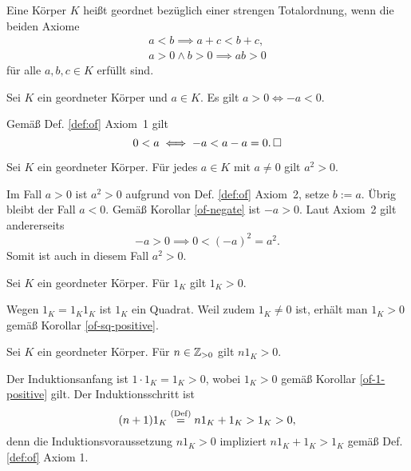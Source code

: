 \begin{Definition}\label{def:of}
Eine Körper $K$ heißt geordnet bezüglich einer strengen Totalordnung,
wenn die beiden Axiome
\begin{gather*}
a<b \implies a+c<b+c,\\
a>0\land b>0\implies ab>0
\end{gather*}
für alle $a,b,c\in K$ erfüllt sind.
\end{Definition}

\begin{Korollar}\label{of-negate}
Sei $K$ ein geordneter Körper und $a\in K$. Es gilt $a>0\iff -a<0$. 
\end{Korollar}
\begin{Beweis}
Gemäß Def. \ref{def:of} Axiom~1 gilt%
\[0<a \iff -a < a-a = 0.\,\square\]
\end{Beweis}

\begin{Korollar}\label{of-sq-positive}
Sei $K$ ein geordneter Körper. Für jedes $a\in K$ mit $a\ne 0$ gilt
$a^2>0$.
\end{Korollar}
\begin{Beweis}
Im Fall $a>0$ ist $a^2>0$ aufgrund von Def. \ref{def:of} Axiom~2, setze
$b:=a$.
Übrig bleibt der Fall $a<0$. Gemäß Korollar \ref{of-negate} ist
$-a>0$. Laut Axiom~2 gilt andererseits%
\[-a > 0 \implies 0 < (-a)^2 = a^2.\]
Somit ist auch in diesem Fall $a^2>0$.\,\qedsymbol
\end{Beweis}

\begin{Korollar}\label{of-1-positive}
Sei $K$ ein geordneter Körper. Für $1_K$ gilt $1_K>0$.
\end{Korollar}

\begin{Beweis}
Wegen $1_K = 1_K 1_K$ ist $1_K$ ein Quadrat. Weil zudem $1_K\ne 0$ ist,
erhält man $1_K>0$ gemäß Korollar \ref{of-sq-positive}.\,\qedsymbol
\end{Beweis}

\begin{Korollar}
Sei $K$ ein geordneter Körper. Für $n\in\mathbb Z_{>0}$ gilt $n1_K>0$.
\end{Korollar}

\begin{Beweis}
Der Induktionsanfang ist $1\cdot 1_K = 1_K > 0$, wobei $1_K>0$ gemäß
Korollar \ref{of-1-positive} gilt. Der Induktionsschritt ist
\[(n+1)1_K \stackrel{\mathrm{(Def)}}{=} n1_K + 1_K > 1_K > 0,\]
denn die Induktionsvoraussetzung $n1_K>0$ impliziert
$n1_K+1_K>1_K$ gemäß Def. \ref{def:of} Axiom 1.\,\qedsymbol
\end{Beweis}

